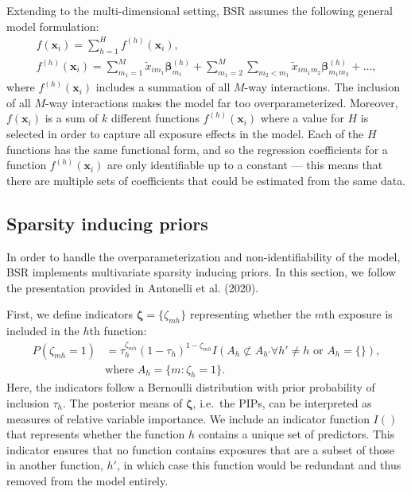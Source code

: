 \documentclass[12pt, twoside]{amherstthesis}
\begin{document}
Extending to the multi-dimensional setting, BSR assumes the following general model formulation:
\begin{gather*}
f(\textbf{x}_i)= \sum_{h=1}^Hf^{(h)}(\textbf{x}_i), \\
f^{(h)}(\textbf{x}_i)= \sum_{m_1=1}^M\widetilde{x}_{im_1}\boldsymbol\beta_{m_1}^{(h)} + 
\sum_{m_1=2}^M\sum_{m_2<m_1}\widetilde{x}_{im_1m_2}\boldsymbol\beta_{m_1m_2}^{(h)} + \dots,
\end{gather*}
\noindent where \(f^{(h)}(\textbf{x}_i)\) includes a summation of all \(M\)-way interactions. The inclusion of all \(M\)-way interactions makes the model far too overparameterized. Moreover, \(f(\textbf{x}_i)\) is a sum of \(k\) different functions \(f^{(h)}(\textbf{x}_i)\) where a value for \(H\) is selected in order to capture all exposure effects in the model. Each of the \(H\) functions has the same functional form, and so the regression coefficients for a function \(f^{(h)}(\textbf{x}_i)\) are only identifiable up to a constant --- this means that there are multiple sets of coefficients that could be estimated from the same data.

\hypertarget{sparsity-inducing-priors}{%
\subsection{Sparsity inducing priors}\label{sparsity-inducing-priors}}

In order to handle the overparameterization and non-identifiability of the model, BSR implements multivariate sparsity inducing priors. In this section, we follow the presentation provided in Antonelli et al. (2020).

First, we define indicators \(\boldsymbol\zeta=\{\zeta_{mh}\}\) representing whether the \(m\)th exposure is included in the \(h\)th function:
\begin{align*}
P(\zeta_{mh}=1) &= \tau_h^{\zeta_{mh}}(1-\tau_h)^{1-\zeta_{mh}} 
I(A_h\not\subset A_{h'}\forall h'\neq h \textrm{ or } A_h=\{\}),\\
&\textrm{where } A_h=\{m:\zeta_h=1\}.
\end{align*}
\noindent Here, the indicators follow a Bernoulli distribution with prior probability of inclusion \(\tau_h\). The posterior means of \(\boldsymbol\zeta\), i.e.~the PIPs, can be interpreted as measures of relative variable importance. We include an indicator function \(I()\) that represents whether the function \(h\) contains a unique set of predictors. This indicator ensures that no function contains exposures that are a subset of those in another function, \(h'\), in which case this function would be redundant and thus removed from the model entirely.
\end{document}

